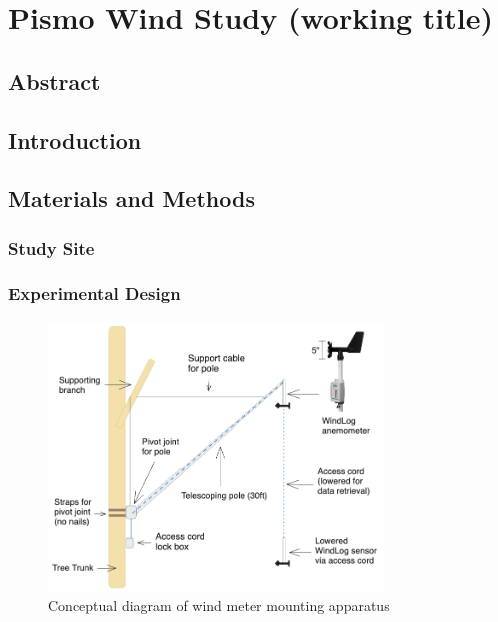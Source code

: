 \chapter{Pismo Wind Study (working title)}

\section{Abstract}

\section{Introduction}
\lipsum[1]  %

\section{Materials and Methods}
\subsection{Study Site}

\subsection{Experimental Design}

\begin{figure}[htbp]
    \centering
    \includegraphics[width=3.5in]{figures/pismoPoleDiagram.png}
    \caption{Conceptual diagram of wind meter mounting apparatus}
\end{figure}




